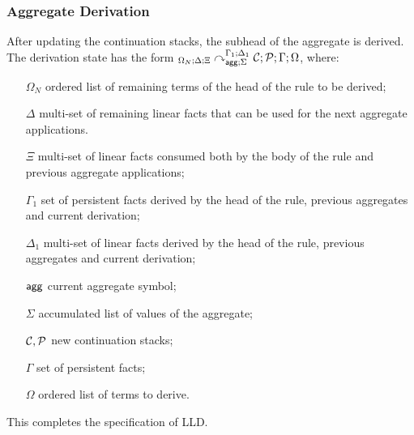 

\subsubsection{Aggregate Derivation}

After updating the continuation stacks, the subhead of the aggregate is derived.
The derivation state has the form
${{}_{\Omega_N ; \Delta ; \Xi}\curvearrowright}_{\mathsf{agg} ; \Sigma}^{\Gamma_1; \Delta_1} \; \mathcal{C};
   \mathcal{P} ; \Gamma ; \Omega$, where:

\begin{enumerate}
   \item[$\Omega_N$] ordered list of remaining terms of the head of the rule to
   be derived;
   \item[$\Delta$] multi-set of remaining linear facts that can be used for
   the next aggregate applications.
   \item[$\Xi$] multi-set of linear facts consumed both by the body of the rule
   and previous aggregate applications;
   \item[$\Gamma_1$] set of persistent facts derived by the head of the rule,
   previous aggregates and current derivation;
   \item[$\Delta_1$] multi-set of linear facts derived by the head of the rule,
   previous aggregates and current derivation;
   \item[$\mathsf{agg}$] current aggregate symbol;
   \item[$\Sigma$] accumulated list of values of the aggregate;
   \item[$\mathcal{C}, \mathcal{P}$] new continuation stacks;
   \item[$\Gamma$] set of persistent facts;
   \item[$\Omega$] ordered list of terms to derive.
\end{enumerate}



This completes the specification of LLD.
